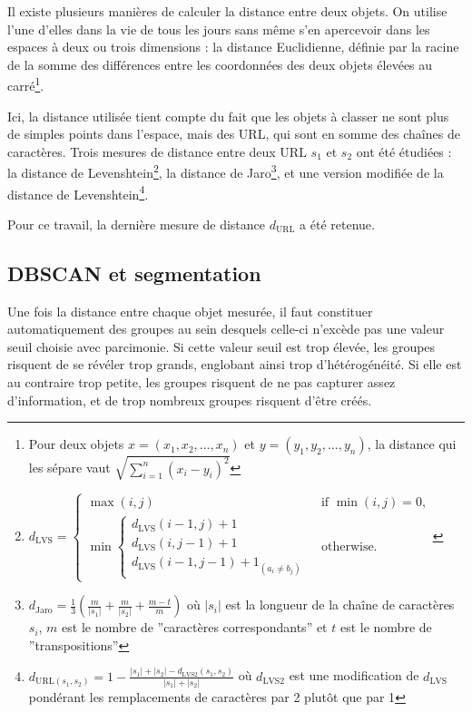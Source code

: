 \documentclass[11pt, a4paper]{article}
\begin{document}
Il existe plusieurs manières de calculer la distance entre deux objets. On utilise l'une d'elles dans la vie de tous les jours sans même s'en apercevoir dans les espaces à deux ou trois dimensions : la distance Euclidienne, définie par la racine de la somme des différences entre les coordonnées des deux objets élevées au carré\footnote{Pour deux objets $x = (x_1, x_2, \dots, x_n)$ et $y = (y_1, y_2, \dots, y_n)$, la distance qui les sépare vaut $\sqrt{\sum_{i=1}^n (x_i-y_i)^2}$}.

Ici, la distance utilisée tient compte du fait que les objets à classer ne sont plus de simples points dans l'espace, mais des URL, qui sont en somme des chaînes de caractères. Trois mesures de distance entre deux URL $s_1$ et $s_2$ ont été étudiées : la distance de Levenshtein\footnote{$d_{\text{LVS}} = \begin{cases}
  \max(i,j) & \text{ if } \min(i,j)=0, \\
  \min \begin{cases}
          d_{\text{LVS}}(i-1,j) + 1 \\
          d_{\text{LVS}}(i,j-1) + 1 \\
          d_{\text{LVS}}(i-1,j-1) + 1_{(a_i \neq b_j)}
       \end{cases} & \text{ otherwise.}
\end{cases}$}, la distance de Jaro\footnote{$d_{\text{Jaro}} = \frac{1}{3}\left(\frac{m}{|s_1|} + \frac{m}{|s_2|} + \frac{m-t}{m}\right)$ où $|s_i|$ est la longueur de la chaîne de caractères $s_i$, $m$ est le nombre de ''caractères correspondants'' et $t$ est le nombre de ''transpositions''}, et une version modifiée de la distance de Levenshtein\footnote{$d_{\text{URL} (s_1, s_2)} = 1 - \frac{|s_1| + |s_2| - d_{\text{LVS2}}(s_1, s_2)}{|s_1| + |s_2|}$ où $d_{\text{LVS2}}$ est une modification de $d_{\text{LVS}}$ pondérant les remplacements de caractères par 2 plutôt que par 1}.

Pour ce travail, la dernière mesure de distance $d_{\text{URL}}$ a été retenue.

\subsection{DBSCAN et segmentation}

Une fois la distance entre chaque objet mesurée, il faut constituer automatiquement des groupes au sein desquels celle-ci n'excède pas une valeur seuil choisie avec parcimonie. Si cette valeur seuil est trop élevée, les groupes risquent de se révéler trop grands, englobant ainsi trop d'hétérogénéité. Si elle est au contraire trop petite, les groupes risquent de ne pas capturer assez d'information, et de trop nombreux groupes risquent d'être créés. 
\end{document}
